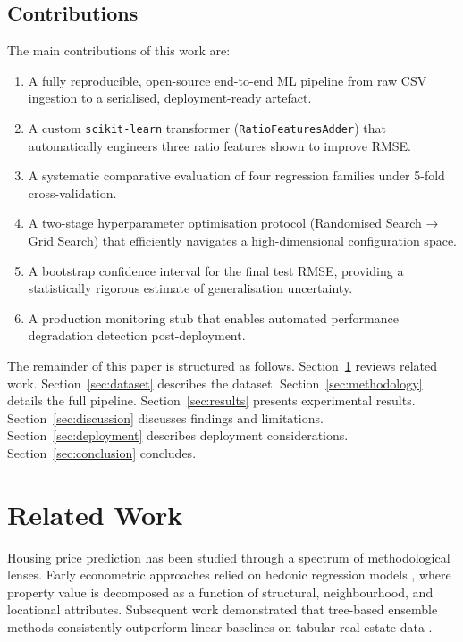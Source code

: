 \documentclass[conference]{IEEEtran}
\begin{document}
\subsection{Contributions}

The main contributions of this work are:
\begin{enumerate}
    \item A fully reproducible, open-source end-to-end ML pipeline from raw CSV ingestion to a serialised, deployment-ready artefact.
    \item A custom \texttt{scikit-learn} transformer (\texttt{RatioFeaturesAdder}) that automatically engineers three ratio features shown to improve RMSE.
    \item A systematic comparative evaluation of four regression families under 5-fold cross-validation.
    \item A two-stage hyperparameter optimisation protocol (Randomised Search → Grid Search) that efficiently navigates a high-dimensional configuration space.
    \item A bootstrap confidence interval for the final test RMSE, providing a statistically rigorous estimate of generalisation uncertainty.
    \item A production monitoring stub that enables automated performance degradation detection post-deployment.
\end{enumerate}

The remainder of this paper is structured as follows. Section~\ref{sec:related} reviews related work. Section~\ref{sec:dataset} describes the dataset. Section~\ref{sec:methodology} details the full pipeline. Section~\ref{sec:results} presents experimental results. Section~\ref{sec:discussion} discusses findings and limitations. Section~\ref{sec:deployment} describes deployment considerations. Section~\ref{sec:conclusion} concludes.

\section{Related Work}
\label{sec:related}

Housing price prediction has been studied through a spectrum of methodological lenses. Early econometric approaches relied on hedonic regression models \cite{rosen1974hedonic}, where property value is decomposed as a function of structural, neighbourhood, and locational attributes. Subsequent work demonstrated that tree-based ensemble methods consistently outperform linear baselines on tabular real-estate data \cite{breiman2001random}.
\end{document}
